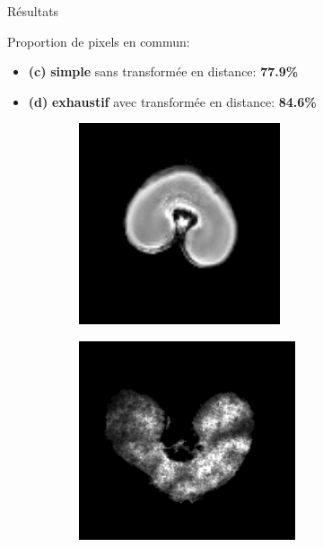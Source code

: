 \documentclass[10pt]{beamer}
\begin{document}
\begin{frame}{Résultats}

  \vspace{-0.3cm}
  Proportion de pixels en commun:
  \begin{itemize}
  \item \textbf{(c)} \textbf{simple} sans transformée en distance: \textbf{77.9\%}
  \item \textbf{(d)} \textbf{exhaustif} avec transformée en distance: \textbf{84.6\%}
  \end{itemize}
  
  \begin{figure}[ht]
    \centering
    \begin{subfigure}[t]{0.33\textwidth}
      \centering
      \includegraphics[width=0.65\textwidth]{fig/mri_slice6}
      \caption{}
      \label{subfig:mri_slice6}
    \end{subfigure}%
    \begin{subfigure}[t]{0.33\textwidth}
      \centering
      \includegraphics[width=0.7\textwidth]{fig/maldi_slice6}

\end{subfigure}
\end{figure}
\end{frame}
\end{document}
